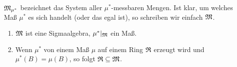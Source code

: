 			\begin{defi}
				$\mathfrak{M}_{\mu^*}$ bezeichnet das System aller $\mu^*$-messbaren Mengen. Ist klar, um welches Maß $\mu^*$ es sich handelt (oder das egal ist), so schreiben wir einfach $\mathfrak{M}$.
			\end{defi}
			
			\begin{satz}
				\begin{enumerate}
					\item $\mathfrak{M}$ ist eine Sigmaalgebra, $\mu^*|_{\mathfrak{M}}$ ein Maß.
					\item Wenn $\mu^*$ von einem Maß $\mu$ auf einem Ring $\mathfrak{R}$ erzeugt wird und $\mu^*(B)=\mu(B)$, so folgt $\mathfrak{R}\subseteq \mathfrak{M}$.
				\end{enumerate}  
			\end{satz}
			
